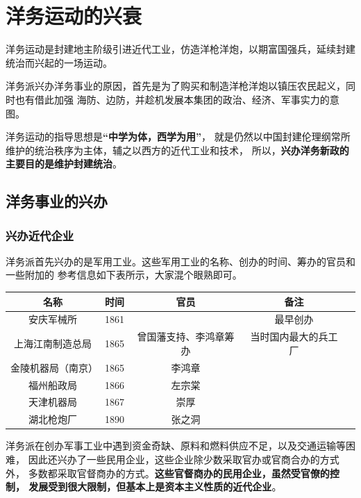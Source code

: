 \documentclass[10pt, UTF8]{book} %
\begin{document}
\section{洋务运动的兴衰}

洋务运动是封建地主阶级引进近代工业，仿造洋枪洋炮，以期富国强兵，延续封建统治而兴起的一场运动。

洋务派兴办洋务事业的原因，首先是为了购买和制造洋枪洋炮以镇压农民起义，同时也有借此加强
海防、边防，并趁机发展本集团的政治、经济、军事实力的意图。

洋务运动的指导思想是\textbf{“中学为体，西学为用”}，
就是仍然以中国封建伦理纲常所维护的统治秩序为主体，辅之以西方的近代工业和技术，
所以，\textbf{兴办洋务新政的主要目的是维护封建统治}。

\subsection{洋务事业的兴办}

\subsubsection{兴办近代企业}


洋务派首先兴办的是军用工业。这些军用工业的名称、创办的时间、筹办的官员和一些附加的
参考信息如下表所示，大家混个眼熟即可。

\begin{table}[H]
    \centering
    \begin{tabular}{c c c c c}
        \toprule
        名称 & 时间 & 官员 & 备注 \\
        \midrule
        安庆军械所 & 1861 & & 最早创办 \\
        上海江南制造总局 & 1865  & 曾国藩支持、李鸿章筹办 & 当时国内最大的兵工厂 \\ 
        金陵机器局（南京） & 1865  & 李鸿章 &  \\ 
        福州船政局 & 1866  & 左宗棠  \\ 
        天津机器局 & 1867  & 崇厚  \\
        湖北枪炮厂 & 1890 & 张之洞 \\   
        \bottomrule  
    \end{tabular}
\end{table}

洋务派在创办军事工业中遇到资金奇缺、原料和燃料供应不足，以及交通运输等困难，
因此还兴办了一些民用企业，这些企业除少数采取官办或官商合办的方式外，
多数都采取官督商办的方式。\textbf{这些官督商办的民用企业，虽然受官僚的控制，
发展受到很大限制，但基本上是资本主义性质的近代企业}。
\end{document}
